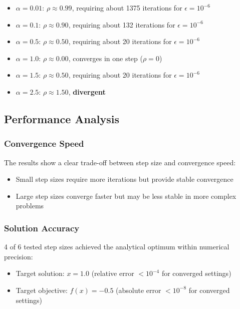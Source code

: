 \documentclass[
  english,
]{article}
\providecommand{\tightlist}{%
  \setlength{\itemsep}{0pt}\setlength{\parskip}{0pt}}
\begin{document}
\begin{itemize}
\tightlist
\item
  \(\alpha = 0.01\): \(\rho \approx 0.99\), requiring
  about 1375 iterations for \(\epsilon = 10^{-6}\)
\item
  \(\alpha = 0.1\): \(\rho \approx 0.90\), requiring about 132
  iterations for \(\epsilon = 10^{-6}\)
\item
  \(\alpha = 0.5\): \(\rho \approx 0.50\), requiring about 20
  iterations for \(\epsilon = 10^{-6}\)
\item
  \(\alpha = 1.0\): \(\rho \approx 0.00\), converges in one step
  (\(\rho = 0\))
\item
  \(\alpha = 1.5\): \(\rho \approx 0.50\), requiring about 20
  iterations for \(\epsilon = 10^{-6}\)
\item
  \(\alpha = 2.5\): \(\rho \approx 1.50\), \textbf{divergent}
\end{itemize}

\subsection{Performance Analysis}\label{performance-analysis}

\subsubsection{Convergence Speed}\label{convergence-speed}

The results show a clear trade-off between step size and convergence
speed:

\begin{itemize}
\tightlist
\item
  Small step sizes require more iterations but provide stable
  convergence
\item
  Large step sizes converge faster but may be less stable in more
  complex problems
\end{itemize}

\subsubsection{Solution Accuracy}\label{solution-accuracy}

4 of 6 tested step sizes achieved the analytical optimum within
numerical precision:

\begin{itemize}
\tightlist
\item
  Target solution: \(x = 1.0\) (relative error \(< 10^{-4}\) for
  converged settings)
\item
  Target objective: \(f(x) = -0.5\) (absolute error \(< 10^{-8}\) for
  converged settings)
\end{itemize}
\end{document}
